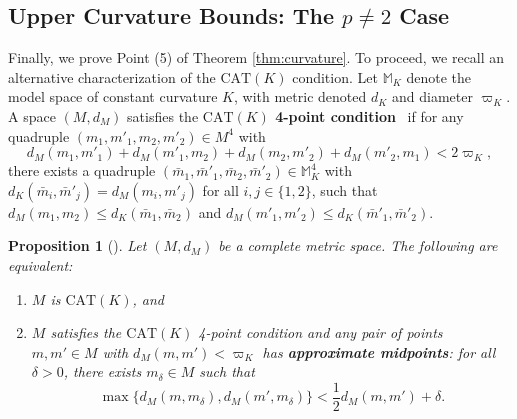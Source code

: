 \documentclass{article}
\newtheorem{proposition}{Proposition}[section]
\theoremstyle{definition}
\begin{document}
\subsection{Upper Curvature Bounds: The \texorpdfstring{$p \neq 2$}{p not 2} Case}\label{sec:upper_curvature_p_not_2}

%

%
%
%

%
%
%



%
%
%

%
%
%

%

%
%
%
%
%
%

%

%
%
%
%
%
%
%
%
%
%
%
%
%
%
%
%
%
%
%
%
    
%
%
%
%
%
%
%
%
%
%
%
%
%
%
%
%
%
%
%
%
%
%
%
%
%
%
%


%

%
%
%
%
%
%
%
%
%
%
%

%


Finally, we prove Point (5) of Theorem \ref{thm:curvature}. To proceed, we recall an alternative characterization of the $\mathrm{CAT}(K)$ condition. Let $\mathbb{M}_K$ denote the model space of constant curvature $K$, with metric denoted $d_K$ and diameter $\varpi_K$.  A space $(M,d_M)$ satisfies the \textbf{$\mathrm{CAT}(K)$ 4-point condition}~\cite[Definition II.1.10]{bridsonhaefliger1999} if for any quadruple $(m_1, m'_1, m_2, m'_2) \in M^4$ with 
\[
d_M(m_1, m'_1) + d_M(m'_1, m_2) + d_M(m_2, m'_2) + d_M(m'_2, m_1) < 2\varpi_{K},
\]
there exists a quadruple $(\bar{m}_1, \bar{m}'_1, \bar{m}_2, \bar{m}'_2) \in \mathbb{M}_{K}^4$ with $d_K(\bar{m}_i, \bar{m}'_j) = d_M(m_i, m'_j)$ for all $i, j \in \{1, 2\}$, such that $d_M(m_1, m_2) \leq d_K(\bar{m}_1, \bar{m}_2)$ and $d_M(m'_1, m'_2) \leq d_K(\bar{m}'_1, \bar{m}'_2)$. 

\begin{proposition}[{\cite[Proposition II.1.11]{bridsonhaefliger1999}}]
    Let $(M,d_M)$ be a complete metric space. The following are equivalent:
    \begin{enumerate}
        \item $M$ is $\mathrm{CAT}(K)$, and
        \item $M$ satisfies the $\mathrm{CAT}(K)$ 4-point condition and any pair of points $m,m' \in M$ with $d_M(m,m') < \varpi_K$ has  \textbf{approximate midpoints}: for all $\delta > 0$, there exists $m_\delta \in M$ such that 
        \[
        \max\{d_M(m,m_\delta),d_M(m',m_\delta)\} < \frac{1}{2} d_M(m,m') + \delta.
        \]
    \end{enumerate}
\end{proposition}
\end{document}
